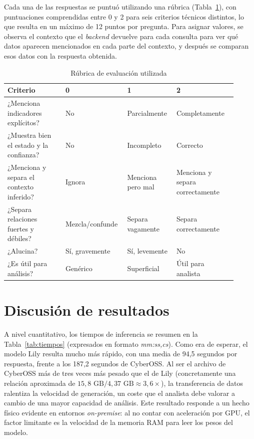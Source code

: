 \documentclass[12pt]{report}
\begin{document}
Cada una de las respuestas se puntuó utilizando una rúbrica (Tabla~\ref{tab:criterios-evaluacion}), con puntuaciones comprendidas entre 0 y 2 para seis criterios técnicos distintos, lo que resulta en un máximo de 12 puntos por pregunta. Para asignar valores, se observa el contexto que el \textit{backend} devuelve para cada consulta para ver qué datos aparecen mencionados en cada parte del contexto, y después se comparan esos datos con la respuesta obtenida.

\begin{table}[H]
	\centering
	\small
	\begin{tabular}{ p{0.24\linewidth}  p{0.22\linewidth}  p{0.2\linewidth}  p{0.25\linewidth}  }
		\toprule
		\textbf{Criterio} & \textbf{0} & \textbf{1} & \textbf{2} \\
		\midrule
		¿Menciona indicadores explícitos? & No & Parcialmente & Completamente \\
		¿Muestra bien el estado y la confianza? & No & Incompleto & Correcto \\
		¿Menciona y separa el contexto inferido? & Ignora & Menciona pero mal & Menciona y separa correctamente \\
		¿Separa relaciones fuertes y débiles? & Mezcla/confunde & Separa vagamente & Separa correctamente \\
		¿Alucina? & Sí, gravemente & Sí, levemente & No \\
		¿Es útil para análisis? & Genérico & Superficial & Útil para analista \\
		\bottomrule
	\end{tabular}
	\caption{Rúbrica de evaluación utilizada}
	\label{tab:criterios-evaluacion}
\end{table}

\section{Discusión de resultados}

A nivel cuantitativo, los tiempos de inferencia se resumen en la Tabla~\ref{tab:tiempos} (expresados en formato \textit{mm:ss,cs}). Como era de esperar, el modelo Lily resulta mucho más rápido, con una media de 94,5 segundos por respuesta, frente a los 187,2 segundos de CyberOSS. Al ser el archivo de CyberOSS más de tres veces más pesado que el de Lily (concretamente una relación aproximada de $15,8\text{ GB} / 4,37\text{ GB} \approx 3,6\times$), la transferencia de datos ralentiza la velocidad de generación, un coste que el analista debe valorar a cambio de una mayor capacidad de análisis. Este resultado responde a un hecho físico evidente en entornos \textit{on-premise}: al no contar con aceleración por GPU, el factor limitante es la velocidad de la memoria RAM para leer los pesos del modelo.
\end{document}
